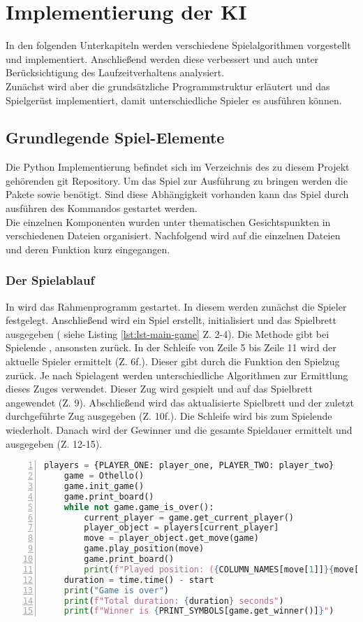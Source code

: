 \chapter{Implementierung der KI}
In den folgenden Unterkapiteln  werden verschiedene Spielalgorithmen vorgestellt und implementiert. Anschließend werden diese verbessert und auch unter Berücksichtigung des Laufzeitverhaltens analysiert.
\\Zunächst wird aber die grundsätzliche Programmstruktur erläutert und das Spielgerüst implementiert, damit unterschiedliche Spieler es ausführen können.
\section{Grundlegende Spiel-Elemente}
Die Python Implementierung befindet sich im Verzeichnis  des zu diesem Projekt gehörenden git Repository. Um das Spiel zur Ausführung zu bringen werden die Pakete  sowie  benötigt. Sind diese Abhängigkeit vorhanden kann das Spiel durch ausführen des Kommandos  gestartet werden.
\\Die einzelnen Komponenten wurden unter thematischen Gesichtspunkten in verschiedenen Dateien organisiert. Nachfolgend wird auf die einzelnen Dateien und deren Funktion kurz eingegangen.
\subsection{Der Spielablauf}
In  wird das Rahmenprogramm gestartet. In diesem werden zunächst die Spieler festgelegt. Anschließend wird ein Spiel erstellt, initialisiert und das Spielbrett ausgegeben ( siehe Listing \ref{lst:lst-main-game} Z. 2-4). Die Methode  gibt bei Spielende , ansonsten  zurück. In der Schleife von Zeile 5 bis Zeile 11 wird der aktuelle Spieler ermittelt (Z. 6f.). Dieser gibt durch die Funktion  den  Spielzug zurück. Je nach Spielagent werden unterschiedliche Algorithmen zur Ermittlung dieses Zuges verwendet. Dieser Zug wird gespielt und auf das Spielbrett angewendet (Z. 9). Abschließend wird das aktualisierte Spielbrett und der zuletzt durchgeführte Zug ausgegeben (Z. 10f.). Die Schleife wird bis zum Spielende wiederholt. Danach wird der Gewinner und die gesamte Spieldauer ermittelt und ausgegeben (Z. 12-15).
\begin{lstlisting}[caption = {Spielablauf in \mxZitat{main-game.py}}, language = python, captionpos = t , numbers=left, label={lst:lst-main-game}]
    players = {PLAYER_ONE: player_one, PLAYER_TWO: player_two}
    game = Othello()
    game.init_game()
    game.print_board()
    while not game.game_is_over():
        current_player = game.get_current_player()
        player_object = players[current_player]
        move = player_object.get_move(game)
        game.play_position(move)
        game.print_board()
        print(f"Played position: ({COLUMN_NAMES[move[1]]}{move[0] + 1})")
    duration = time.time() - start
    print("Game is over")
    print(f"Total duration: {duration} seconds")
    print(f"Winner is {PRINT_SYMBOLS[game.get_winner()]}")
\end{lstlisting}
